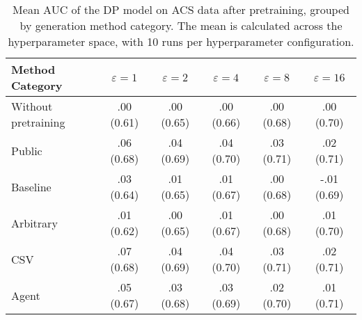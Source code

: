 \begin{table}[h!]
    \centering
    \caption{Mean AUC of the DP model on ACS data after pretraining, grouped by generation method category. The mean is calculated across the hyperparameter space, with 10 runs per hyperparameter configuration.}
    \label{tab:epsilon_comparison}
    \begin{tabular}{lccccc}
    \toprule
    Method Category & $\varepsilon=1$ & $\varepsilon=2$ & $\varepsilon=4$ & $\varepsilon=8$ & $\varepsilon=16$ \\
    \midrule
    Without pretraining & .00 {\small (0.61)} & .00 {\small (0.65)} & .00 {\small (0.66)} & .00 {\small (0.68)} & .00 {\small (0.70)} \\
    \arrayrulecolor{black!50!}\midrule
    Public & \cellcolor{silver!30}.06 {\small (0.68)} & \cellcolor{silver!30}.04 {\small (0.69)} & \cellcolor{silver!30}.04 {\small (0.70)} & \cellcolor{silver!30}.03 {\small (0.71)} & \cellcolor{gold!30}.02 {\small (0.71)} \\
    \arrayrulecolor{black!50!}\midrule
    Baseline & .03 {\small (0.64)} & .01 {\small (0.65)} & .01 {\small (0.67)} & .00 {\small (0.68)} & -.01 {\small (0.69)} \\
    \arrayrulecolor{black!50!}\midrule
    Arbitrary & .01 {\small (0.62)} & .00 {\small (0.65)} & .01 {\small (0.67)} & .00 {\small (0.68)} & .01 {\small (0.70)} \\
    \arrayrulecolor{black!50!}\midrule
    CSV & \cellcolor{gold!30}.07 {\small (0.68)} & \cellcolor{gold!30}.04 {\small (0.69)} & \cellcolor{gold!30}.04 {\small (0.70)} & \cellcolor{gold!30}.03 {\small (0.71)} & \cellcolor{silver!30}.02 {\small (0.71)} \\
    Agent & \cellcolor{bronze!30}.05 {\small (0.67)} & \cellcolor{bronze!30}.03 {\small (0.68)} & \cellcolor{bronze!30}.03 {\small (0.69)} & \cellcolor{bronze!30}.02 {\small (0.70)} & \cellcolor{bronze!30}.01 {\small (0.71)} \\
    \bottomrule
    \end{tabular}
\end{table}